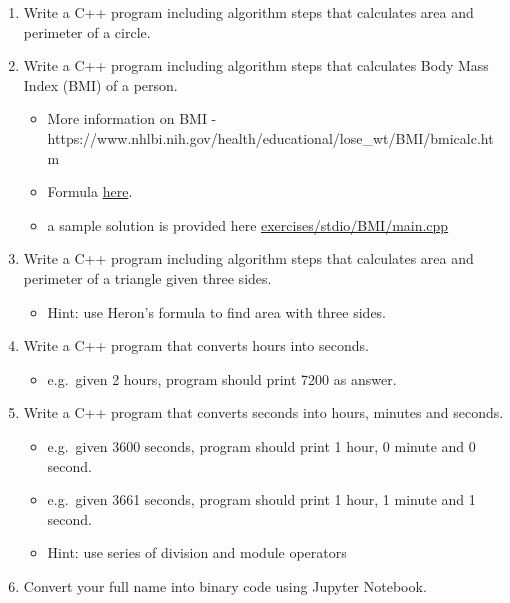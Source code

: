 \documentclass[11pt]{article}
\providecommand{\tightlist}{%
      \setlength{\itemsep}{0pt}\setlength{\parskip}{0pt}}
\begin{document}
\begin{enumerate}
\def\labelenumi{\arabic{enumi}.}
\tightlist
\item
  Write a C++ program including algorithm steps that calculates area and
  perimeter of a circle.
\item
  Write a C++ program including algorithm steps that calculates Body
  Mass Index (BMI) of a person.

  \begin{itemize}
  \tightlist
  \item
    More information on BMI -
    https://www.nhlbi.nih.gov/health/educational/lose\_wt/BMI/bmicalc.htm
  \item
    Formula
    \href{https://www.cdc.gov/healthyweight/assessing/bmi/childrens_bmi/childrens_bmi_formula.html\#:~:text=The\%20formula\%20for\%20BMI\%20is,to\%20convert\%20this\%20to\%20meters.\&text=When\%20using\%20English\%20measurements\%2C\%20pounds\%20should\%20be\%20divided\%20by\%20inches\%20squared}{here}.
  \item
    a sample solution is provided here
    \url{exercises/stdio/BMI/main.cpp}
  \end{itemize}
\item
  Write a C++ program including algorithm steps that calculates area and
  perimeter of a triangle given three sides.

  \begin{itemize}
  \tightlist
  \item
    Hint: use Heron's formula to find area with three sides.
  \end{itemize}
\item
  Write a C++ program that converts hours into seconds.

  \begin{itemize}
  \tightlist
  \item
    e.g.~given 2 hours, program should print 7200 as answer.
  \end{itemize}
\item
  Write a C++ program that converts seconds into hours, minutes and
  seconds.

  \begin{itemize}
  \tightlist
  \item
    e.g.~given 3600 seconds, program should print 1 hour, 0 minute and 0
    second.
  \item
    e.g.~given 3661 seconds, program should print 1 hour, 1 minute and 1
    second.
  \item
    Hint: use series of division and module operators
  \end{itemize}
\item
  Convert your full name into binary code using Jupyter Notebook.
\end{enumerate}
\end{document}
